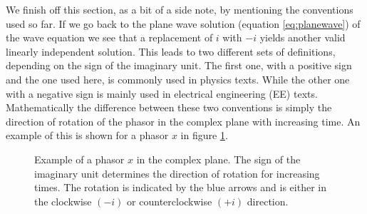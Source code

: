 We finish off this section, as a bit of a side note, by mentioning the conventions used so far. If we go back to the plane wave solution (equation \ref{eq:planewave}) of the wave equation we see that a replacement of $i$ with $-i$ yields another valid linearly independent solution. This leads to two different sets of definitions, depending on the sign of the imaginary unit. The first one, with a positive sign and the one used here, is commonly used in physics texts. While the other one with a negative sign is mainly used in electrical engineering (EE) texts. Mathematically the difference between these two conventions is simply the direction of rotation of the phasor in the complex plane with increasing time. An example of this is shown for a phasor $x$ in figure \ref{fig:phasor}. 

\begin{figure}[h]
    \centering
    
    \caption{Example of a phasor $x$ in the complex plane. The sign of the imaginary unit determines the direction of rotation for increasing times. The rotation is indicated by the blue arrows and is either in the clockwise $(-i)$ or counterclockwise $(+i)$ direction.}
    \label{fig:phasor}
\end{figure}

